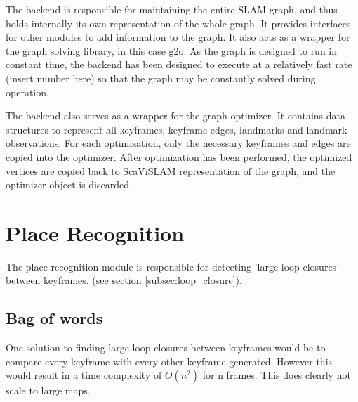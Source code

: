 The backend is responsible for maintaining the entire SLAM graph, and thus holds internally its own representation of the whole graph.  It provides interfaces for other modules to add information to the graph. It also acts as a wrapper for the graph solving library, in this case g2o. As the graph is designed to run in constant time, the backend has been designed to execute at a relatively fast rate (insert number here) so that the graph may be constantly solved during operation.


The backend also serves as a wrapper for the graph optimizer.  It contains data structures to represent all keyframes, keyframe edges, landmarks and landmark observations.  For each optimization, only the necessary keyframes and edges are copied into the optimizer.  After optimization has been performed, the optimized vertices are copied back to ScaViSLAM representation of the graph, and the optimizer object is discarded.

\section{Place Recognition}
\label{sec:scavislam_place_recog}

The place recognition module is responsible for detecting 'large loop closures' between keyframes.
(see section \ref{subsec:loop_closure}).

\subsection{Bag of words}

One solution to finding large loop closures between keyframes would be to compare every keyframe with every other keyframe generated.  However this would result in a time complexity of $O(n^2)$ for n frames.  This does clearly not scale to large maps.

